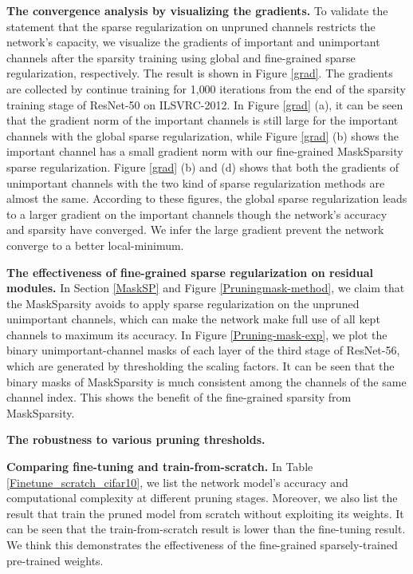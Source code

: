 \documentclass[review]{cvpr}
\begin{document}
\textbf{The convergence analysis by visualizing the gradients.} To validate the statement that the sparse regularization on unpruned channels restricts the network's capacity, we visualize the gradients of important and unimportant channels after the sparsity training using global and fine-grained sparse regularization, respectively. The result is shown in Figure \ref{grad}. The gradients are collected by continue training for 1,000 iterations from the end of the sparsity training stage of ResNet-50 on ILSVRC-2012. In Figure \ref{grad} (a), it can be seen that the gradient norm of the important channels is still large for the important channels with the global sparse regularization, while Figure \ref{grad} (b) shows the important channel has a small gradient norm with our fine-grained MaskSparsity sparse regularization. Figure \ref{grad} (b) and (d) shows that both the gradients of unimportant channels with the two kind of sparse regularization methods are almost the same. According to these figures, the global sparse regularization leads to a larger gradient on the important channels though the network's accuracy and sparsity have converged. We infer the large gradient prevent the network converge to a better local-minimum.

\textbf{The effectiveness of fine-grained sparse regularization on residual modules.} In Section \ref{MaskSP} and Figure \ref{Pruningmask-method}, we claim that the MaskSparsity avoids to apply sparse regularization on the unpruned unimportant channels, which can make the network make full use of all kept channels to maximum its accuracy. In Figure \ref{Pruning-mask-exp}, we plot the binary unimportant-channel masks of each layer of the third stage of ResNet-56, which are generated by thresholding the scaling factors. It can be seen that the binary masks of MaskSparsity is much consistent among the channels of the same channel index. This shows the benefit of the fine-grained sparsity from MaskSparsity.

\textbf{The robustness to various pruning thresholds.} 


\textbf{Comparing fine-tuning and train-from-scratch.} 
In Table \ref{Finetune_scratch_cifar10}, we list the network model's accuracy and computational complexity at different pruning stages. Moreover, we also list the result that train the pruned model from scratch without exploiting its weights. It can be seen that the train-from-scratch result is lower than the fine-tuning result. We think this demonstrates the effectiveness of the fine-grained sparsely-trained pre-trained weights.
\end{document}
